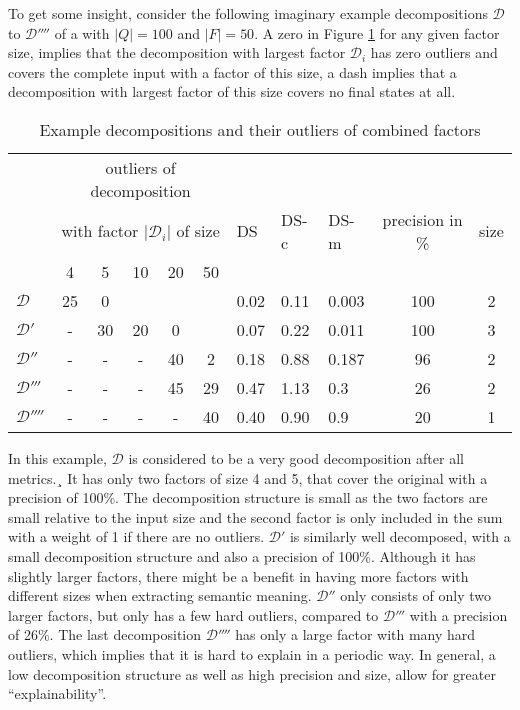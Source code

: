 To get some insight, consider the following imaginary example decompositions $\mathcal{D}$ to $\mathcal{D}''''$ of a \DFA with $|Q| = 100$ and $|F| = 50$.
A zero in Figure \ref{tab:metric-example-decompositions} for any given factor size, implies that the decomposition with largest factor $\mathcal{D}_i$ has zero outliers and covers the complete input \DFA with a factor of this size, a dash implies that a decomposition with largest factor of this size covers no final states at all.
\begin{table}[h]
	\centering
	\begin{tabular}{l|ccccc|lllcc}
		& \multicolumn{5}{c}{outliers of decomposition}  & & & & & \\
		& \multicolumn{5}{c}{with factor $|\mathcal{D}_i|$ of size} & DS & DS-c & DS-m & precision in \% & size \\
		& 4 & 5 & 10 & 20 & 50 & & & & & \\
		\hline
		$\mathcal{D}$ & 25 & 0 & &  & & 0.02 & 0.11 & 0.003 & 100 & 2\\		
		$\mathcal{D}'$ & - & 30 & 20 & 0 & & 0.07 & 0.22& 0.011 & 100 & 3\\
		$\mathcal{D}''$ & - & - & - & 40 & 2 & 0.18 & 0.88 & 0.187 &  96 & 2\\
		$\mathcal{D}'''$ & - & - & - & 45 & 29 & 0.47 & 1.13 & 0.3 & 26 & 2\\
		$\mathcal{D}''''$ & - & - & - & - & 40 & 0.40 & 0.90 & 0.9 & 20 & 1\\
	\end{tabular}
	\caption{Example decompositions and their outliers of combined factors}
	\label{tab:metric-example-decompositions}
\end{table}
In this example, $\mathcal{D}$ is considered to be a very good decomposition after all metrics.¸
It has only two factors of size 4 and 5, that cover the original \DFA with a precision of 100\%.
The decomposition structure is small as the two factors are small relative to the input size and the second factor is only included in the sum with a weight of 1 if there are no outliers.
$\mathcal{D}'$ is similarly well decomposed, with a small decomposition structure and also a precision of 100\%.
Although it has slightly larger factors, there might be a benefit in having more factors with different sizes when extracting semantic meaning.
$\mathcal{D}''$ only consists of only two larger factors, but only has a few hard outliers, compared to $\mathcal{D}'''$ with a precision of 26\%.
The last decomposition $\mathcal{D}''''$ has only a large factor with many hard outliers, which implies that it is hard to explain in a periodic way.
In general, a low decomposition structure as well as high precision and size, allow for greater \enquote{explainability}.


